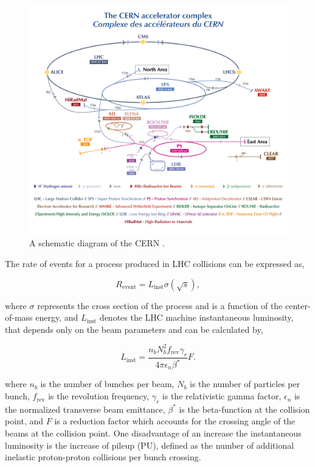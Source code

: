 \begin{figure}[t]
    \centering
    \includegraphics[width=\textwidth]{Figures/cern.png}
    \caption{A schematic diagram of the CERN  \cite{Bartosik:2847538}.}
    \label{fig:CERN_Schematic}
\end{figure}

The rate of events for a process produced in LHC collisions can be expressed as,

\begin{equation}
R_{\text{event}} = L_{\text{inst}} \sigma(\sqrt{s}), 
\end{equation}

where $\sigma$ represents the cross section of the process and is a function of the center-of-mass energy, and $L_{\text{inst}}$ denotes the LHC machine instantaneous luminosity, that depends only on the beam parameters and can be calculated by,

\begin{equation}
L_{\text{inst}} = \frac{n_{b}N_{b}^{2}f_{\text{rev}}\gamma_{r}}{4\pi \epsilon_{n}\beta^{*}}F.
\end{equation}

where $n_b$ is the number of bunches per beam, $N_b$ is the number of particles per bunch, $f_{\text{rev}}$ is the revolution frequency, $\gamma_r$ is the relativistic gamma factor, $\epsilon_n$ is the normalized transverse beam emittance, $\beta^*$ is the beta-function at the collision point, and $F$ is a reduction factor which accounts for the crossing angle of the beams at the collision point. 
One disadvantage of an increase the instantaneous luminosity is the increase of pileup (PU), defined as the number of additional inelastic proton-proton collisions per bunch crossing. \\

